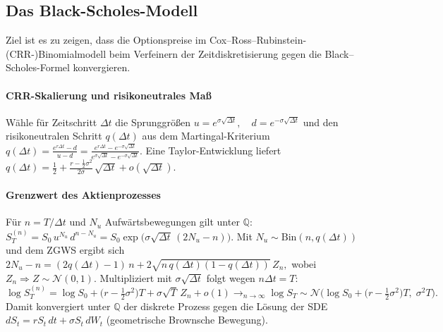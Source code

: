 \subsection{Das Black-Scholes-Modell}
Ziel ist es zu zeigen, dass die Optionspreise im Cox–Ross–Rubinstein-(CRR-)Binomialmodell
beim Verfeinern der Zeitdiskretisierung gegen die Black–Scholes-Formel konvergieren.

\paragraph{CRR-Skalierung und risikoneutrales Maß}
Wähle für Zeitschritt $\Delta t$ die Sprunggrößen
$
u = e^{\sigma \sqrt{\Delta t}},\quad d = e^{-\sigma \sqrt{\Delta t}}
$
und den risikoneutralen Schritt $q(\Delta t)$ aus dem Martingal-Kriterium
$
q(\Delta t) = \frac{e^{r \Delta t} - d}{u - d}
= \frac{e^{r \Delta t} - e^{-\sigma \sqrt{\Delta t}}}{e^{\sigma \sqrt{\Delta t}} - e^{-\sigma \sqrt{\Delta t}}}.
$
Eine Taylor-Entwicklung liefert
$
q(\Delta t) = \tfrac12 + \frac{r - \tfrac12 \sigma^2}{2\sigma}\,\sqrt{\Delta t} + o(\sqrt{\Delta t}).
$

\paragraph{Grenzwert des Aktienprozesses}
Für $n=T/\Delta t$ und $N_u$ Aufwärtsbewegungen gilt unter $\mathbb Q$:
$
S_T^{(n)} = S_0\, u^{N_u}\, d^{n-N_u}
= S_0 \exp\!\big(\sigma \sqrt{\Delta t}\,(2N_u - n)\big).
$
Mit $N_u \sim \mathrm{Bin}(n, q(\Delta t))$ und dem ZGWS ergibt sich
$
2N_u - n
= (2q(\Delta t)-1)\,n + 2\sqrt{n\,q(\Delta t)(1-q(\Delta t))}\,Z_n,
$
wobei $Z_n \Rightarrow Z \sim \mathcal N(0,1)$. Multipliziert mit $\sigma \sqrt{\Delta t}$ folgt wegen $n\Delta t = T$:
\[
\log S_T^{(n)}
= \log S_0 + \big(r - \tfrac12 \sigma^2\big)T + \sigma \sqrt{T}\,Z_n + o(1)
\longrightarrow_{n\to\infty}
\log S_T \sim \mathcal N\!\Big(\log S_0 + \big(r - \tfrac12 \sigma^2\big)T,\;\sigma^2 T\Big).
\]
Damit konvergiert unter $\mathbb Q$ der diskrete Prozess gegen die Lösung der SDE
$
dS_t = r S_t\,dt + \sigma S_t\,dW_t
$
(geometrische Brownsche Bewegung).

